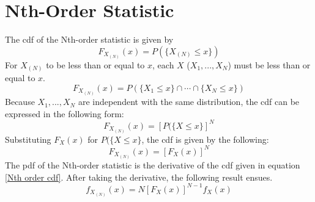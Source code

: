 \documentclass[conference]{IEEEtran}
\begin{document}
\section{Nth-Order Statistic}
\label{Nth-Order Statistic Section}
The cdf of the Nth-order statistic is given by
\begin{equation}
F_{X_{(N)}}(x) = P(\{X_{(N)} \leq x\})
\end{equation}
For $X_{(N)}$ to be less than or equal to $x$, each $X$ ($X_1,...,X_N$) must be less than or equal to $x$.
\begin{equation}
F_{X_{(N)}}(x) = P(\{X_1 \leq x \} \cap \cdots \cap \{X_N \leq x \})
\end{equation}
Because $X_1,...,X_N$ are independent with the same distribution, the cdf can be expressed in the following form:
\begin{equation}
F_{X_{(N)}}(x) = [P(\{X \leq x \}]^N
\end{equation}
Substituting $F_X(x)$ for $P(\{X \leq x \}$, the cdf is given by the following:
\begin{equation}
\label{Nth order cdf}
F_{X_{(N)}}(x) = [F_X(x)]^N
\end{equation}
The pdf of the Nth-order statistic is the derivative of the cdf given in equation \eqref{Nth order cdf}. After taking the derivative, the following result ensues.
\begin{equation}
f_{X_{(N)}}(x) = N[F_X(x)]^{N-1}f_X(x)
\end{equation}
\end{document}
